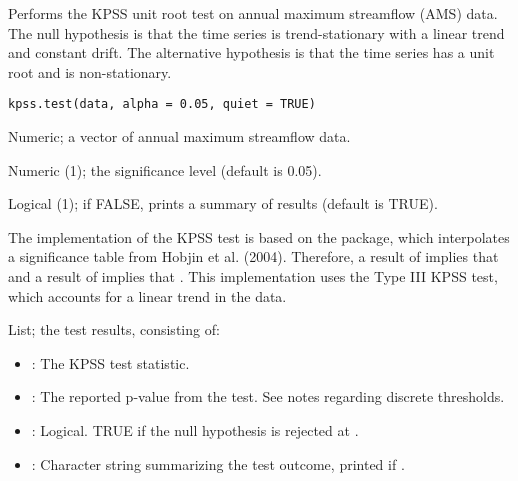 \documentclass[a4paper]{book}
\begin{document}
%
\begin{Description}
Performs the KPSS unit root test on annual maximum streamflow (AMS) data.
The null hypothesis is that  the time series is trend-stationary with a linear
trend and constant drift.  The alternative hypothesis is that the time series
has a unit root and is non-stationary.
\end{Description}
%
\begin{Usage}
\begin{verbatim}
kpss.test(data, alpha = 0.05, quiet = TRUE)
\end{verbatim}
\end{Usage}
%
\begin{Arguments}
\begin{ldescription}
\item[\code{data}] Numeric; a vector of annual maximum streamflow data.

\item[\code{alpha}] Numeric (1); the significance level (default is 0.05).

\item[\code{quiet}] Logical (1); if FALSE, prints a summary of results (default is TRUE).
\end{ldescription}
\end{Arguments}
%
\begin{Details}
The implementation of the KPSS test is based on the  package, which interpolates
a significance table from Hobjin et al. (2004). Therefore, a result of 
implies that  and a result of  implies that .
This implementation uses the Type III KPSS test, which accounts for a linear trend in the data.
\end{Details}
%
\begin{Value}
List; the test results, consisting of:
\begin{itemize}

\item{} : The KPSS test statistic.
\item{} : The reported p-value from the test. See notes regarding discrete thresholds.
\item{} : Logical. TRUE if the null hypothesis is rejected at .
\item{} : Character string summarizing the test outcome, printed if .

\end{itemize}

\end{Value}
\end{document}
